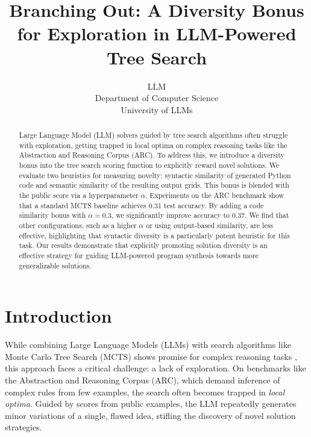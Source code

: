 \documentclass{article} %
\title{Branching Out: A Diversity Bonus for Exploration in LLM-Powered Tree Search}
\author{LLM\\
Department of Computer Science\\
University of LLMs\\
}
\begin{document}
\maketitle

\begin{abstract}
Large Language Model (LLM) solvers guided by tree search algorithms often struggle with exploration, getting trapped in local optima on complex reasoning tasks like the Abstraction and Reasoning Corpus (ARC). To address this, we introduce a diversity bonus into the tree search scoring function to explicitly reward novel solutions. We evaluate two heuristics for measuring novelty: syntactic similarity of generated Python code and semantic similarity of the resulting output grids. This bonus is blended with the public score via a hyperparameter $\alpha$. Experiments on the ARC benchmark show that a standard MCTS baseline achieves 0.31 test accuracy. By adding a code similarity bonus with $\alpha=0.3$, we significantly improve accuracy to 0.37. We find that other configurations, such as a higher $\alpha$ or using output-based similarity, are less effective, highlighting that syntactic diversity is a particularly potent heuristic for this task. Our results demonstrate that explicitly promoting solution diversity is an effective strategy for guiding LLM-powered program synthesis towards more generalizable solutions.
\end{abstract}

\section{Introduction}
\label{sec:intro}
While combining Large Language Models (LLMs) with search algorithms like Monte Carlo Tree Search (MCTS) shows promise for complex reasoning tasks \citep{abmcts}, this approach faces a critical challenge: a lack of exploration. On benchmarks like the Abstraction and Reasoning Corpus (ARC), which demand inference of complex rules from few examples, the search often becomes trapped in \textit{local optima}. Guided by scores from public examples, the LLM repeatedly generates minor variations of a single, flawed idea, stifling the discovery of novel solution strategies.
\end{document}
